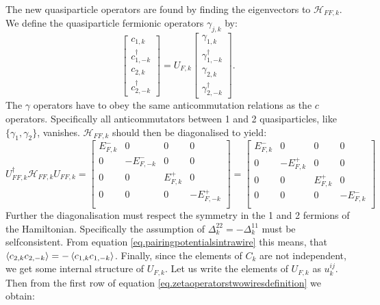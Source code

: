 The new quasiparticle operators are found by finding the eigenvectors to $\mathcal{H}_{FF,k}$. We define the quasiparticle fermionic operators $\gamma_{j,k}$ by:
\begin{equation}
\begin{bmatrix} c_{1,k} \\ c^\dagger_{1,-k} \\ c_{2,k} \\ c^\dagger_{2,-k} \end{bmatrix} = U_{F,k}\begin{bmatrix} \gamma_{1,k} \\ \gamma^{\dagger}_{1,-k} \\ \gamma_{2,k} \\ \gamma^{\dagger}_{2,-k} \end{bmatrix}.
\label{eq.zetaoperatorstwowiresdefinition}
\end{equation} 
The $\gamma$ operators have to obey the same anticommutation relations as the $c$ operators. Specifically all anticommutators between 1 and 2 quasiparticles, like $\{\gamma_1, \gamma_2 \} $, vanishes. $\mathcal{H}_{FF,k}$ should then be diagonalised to yield:
\begin{equation}
U^\dagger_{FF,k}\mathcal{H}_{FF,k}U_{FF,k} = \begin{bmatrix} 
E^{-}_{F,k} & 0        & 0       & 0        \\ 
0       & -E^{-}_{F,-k} & 0       & 0        \\ 
0       & 0        & E^{+}_{F,k} & 0        \\ 
0       & 0        & 0       & -E^{+}_{F,-k} \\ 
\end{bmatrix} = \begin{bmatrix} 
E^{-}_{F,k} & 0        & 0       & 0        \\ 
0       & -E^{+}_{F,k} & 0       & 0        \\ 
0       & 0        & E^{+}_{F,k} & 0        \\ 
0       & 0        & 0       & -E^{-}_{F,k} \\ 
\end{bmatrix} \nonumber
\end{equation}
Further the diagonalisation must respect the symmetry in the 1 and 2 fermions of the Hamiltonian. Specifically the assumption of $\Delta^{22}_k = -\Delta^{11}_k$ must be selfconsistent. From equation \ref{eq.pairingpotentialsintrawire} this means, that $\braket{c_{2,k}c_{2,-k}} = -\braket{c_{1,k}c_{1,-k}}$. Finally, since the elements of $C_k$ are not independent, we get some internal structure of $U_{F,k}$. Let us write the elements of $U_{F,k}$ as $u^{ij}_k$. Then from the first row of equation \eqref{eq.zetaoperatorstwowiresdefinition} we obtain: 

